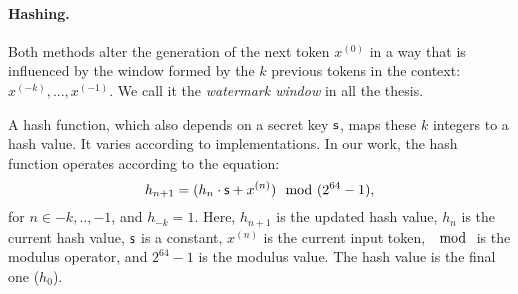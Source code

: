 \paragraph*{Hashing.}
Both methods alter the generation of the next token $x^{(0)}$ in a way that is influenced by the window formed by the $k$ previous tokens in the context: $x^{(-k)}, ..., x^{(-1)}$. 
We call it the \emph{watermark window} in all the thesis.

A hash function, which also depends on a secret key $\mathsf{s}$, maps these $k$ integers to a hash value.
It varies according to implementations. 
In our work, the hash function operates according to the equation: 
$$h_{n+1} = (h_{n} \cdot \mathsf{s} + x^{(n)}) \mod (2^{64} - 1),$$ 
for $n \in -k, .., -1$, and $h_{-k} = 1$.
Here, $h_{n+1}$ is the updated hash value, $h_{n}$ is the current hash value, $\mathsf{s}$ is a constant, $x^{(n)}$ is the current input token, $\mod$ is the modulus operator, and $2^{64} - 1$ is the modulus value. 
The hash value is the final one ($h_0$).

